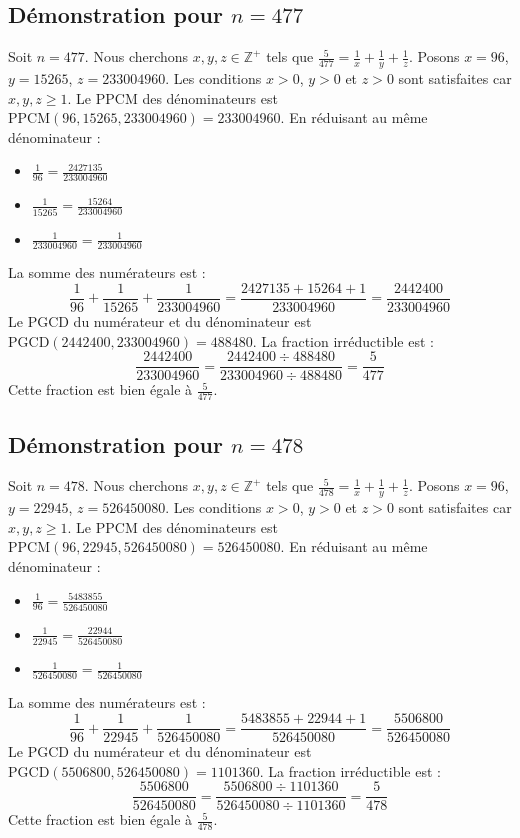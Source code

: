 \documentclass[11pt,a4paper]{article}
\begin{document}
\subsection{Démonstration pour $n = 477$}
Soit $n = 477$. Nous cherchons $x, y, z \in \mathbb{Z}^{+}$ tels que $\frac{5}{477} = \frac{1}{x} + \frac{1}{y} + \frac{1}{z}$.
Posons $x = 96$, $y = 15265$, $z = 233004960$.
Les conditions $x > 0$, $y > 0$ et $z > 0$ sont satisfaites car $x, y, z \geq 1$.
Le PPCM des dénominateurs est $\text{PPCM}(96, 15265, 233004960) = 233004960$.
En réduisant au même dénominateur :
\begin{itemize}
    \item $\frac{1}{96} = \frac{2427135}{233004960}$
    \item $\frac{1}{15265} = \frac{15264}{233004960}$
    \item $\frac{1}{233004960} = \frac{1}{233004960}$
\end{itemize}
La somme des numérateurs est :
$$ \frac{1}{96} + \frac{1}{15265} + \frac{1}{233004960} = \frac{2427135 + 15264 + 1}{233004960} = \frac{2442400}{233004960} $$
Le PGCD du numérateur et du dénominateur est $\text{PGCD}(2442400, 233004960) = 488480$.
La fraction irréductible est :
$$ \frac{2442400}{233004960} = \frac{2442400 \div 488480}{233004960 \div 488480} = \frac{5}{477} $$
Cette fraction est bien égale à $\frac{5}{477}$.

\subsection{Démonstration pour $n = 478$}
Soit $n = 478$. Nous cherchons $x, y, z \in \mathbb{Z}^{+}$ tels que $\frac{5}{478} = \frac{1}{x} + \frac{1}{y} + \frac{1}{z}$.
Posons $x = 96$, $y = 22945$, $z = 526450080$.
Les conditions $x > 0$, $y > 0$ et $z > 0$ sont satisfaites car $x, y, z \geq 1$.
Le PPCM des dénominateurs est $\text{PPCM}(96, 22945, 526450080) = 526450080$.
En réduisant au même dénominateur :
\begin{itemize}
    \item $\frac{1}{96} = \frac{5483855}{526450080}$
    \item $\frac{1}{22945} = \frac{22944}{526450080}$
    \item $\frac{1}{526450080} = \frac{1}{526450080}$
\end{itemize}
La somme des numérateurs est :
$$ \frac{1}{96} + \frac{1}{22945} + \frac{1}{526450080} = \frac{5483855 + 22944 + 1}{526450080} = \frac{5506800}{526450080} $$
Le PGCD du numérateur et du dénominateur est $\text{PGCD}(5506800, 526450080) = 1101360$.
La fraction irréductible est :
$$ \frac{5506800}{526450080} = \frac{5506800 \div 1101360}{526450080 \div 1101360} = \frac{5}{478} $$
Cette fraction est bien égale à $\frac{5}{478}$.
\end{document}
